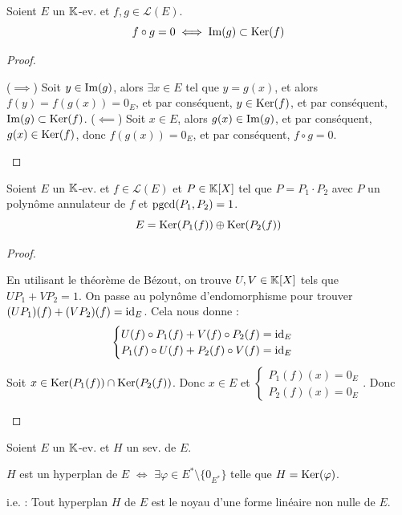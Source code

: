 \documentclass[12pt,a4paper]{report}
\begin{document}
\begin{theorem}[Lemme]
    Soient $E$ un $\mathbb{K}$-ev. et $f,g \in \mathcal L(E)$.
    $$f \circ g = 0 \iff \mathrm{Im}(g) \subset \mathrm{Ker}(f)$$
\end{theorem}

\begin{proof}
    \begin{outline}
        \1 ($\implies$) Soit $y \in \mathrm{Im}(g)$, alors $\exists x \in E$ tel que $y = g(x)$, et alors $f(y) = f(g(x)) = 0_E$, et par conséquent, $y \in \mathrm{Ker}(f)$, et par conséquent, $\mathrm{Im}(g) \subset \mathrm{Ker}(f)$.
        \1 ($\impliedby$) Soit $x \in E$, alors $g(x) \in \mathrm{Im}(g)$, et par conséquent, $g(x) \in \mathrm{Ker}(f)$, donc $f(g(x)) = 0_E$, et par conséquent, $f\circ g = 0$.
    \end{outline}
\end{proof}

\begin{theorem}
    Soient $E$ un $\mathbb{K}$-ev. et $f \in \mathcal L(E)$ et $P \in \mathbb{K}[X]$ tel que $P = P_1\cdot P_2$ avec $P$ un polynôme annulateur de $f$ et $\mathrm{pgcd}(P_1,P_2) = 1$.
    $$E = \mathrm{Ker}(P_1(f)) \oplus \mathrm{Ker}(P_2(f))$$
\end{theorem}

\begin{proof}
    \begin{outline}
        \1 En utilisant le théorème de Bézout, on trouve $U,V \in \mathbb{K}[X]$ tels que $UP_1 + VP_2 = 1$.
        \1 On passe au polynôme d'endomorphisme pour trouver $(UP_1)(f) + (VP_2)(f) = \mathrm{id}_E$.
        \1 Cela nous donne :
        $$\begin{cases}
        U(f)\circ P_1(f) + V(f)\circ P_2(f) = \mathrm{id}_E\\
        P_1(f)\circ U(f) + P_2(f)\circ V(f) = \mathrm{id}_E
        \end{cases}$$
        \1 Soit $x \in \mathrm{Ker}(P_1(f)) \cap \mathrm{Ker}(P_2(f))$.
        \1 Donc $x \in E$ et $\begin{cases} P_1(f)(x) = 0_E\\ P_2(f)(x) = 0_E\end{cases}$.
        \1 Donc 
    \end{outline}
\end{proof}

\begin{property}
    Soient $E$ un $\mathbb{K}$-ev. et $H$ un sev. de $E$.

    $H$ est un hyperplan de $E$ $\iff$ $\exists \varphi \in E^* \setminus \{0_{E^*}\}$ telle que $H = \mathrm{Ker}(\varphi)$.
    
    i.e. : Tout hyperplan $H$ de $E$ est le noyau d'une forme linéaire non nulle de $E$.
\end{property}
\end{document}
